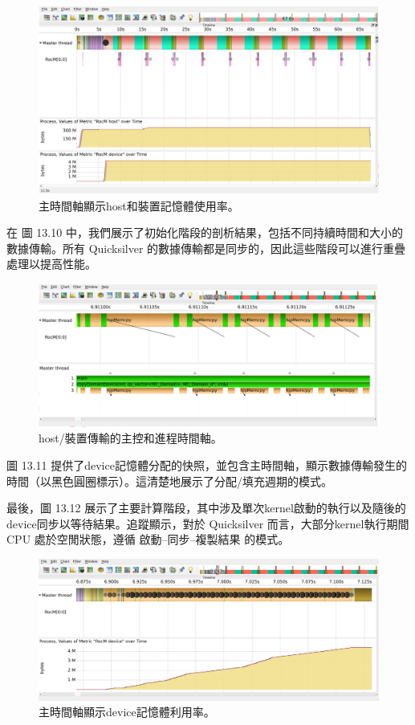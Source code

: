 \begin{figure}
    \centering
    \includegraphics[width=0.9\linewidth]{FileAusiliari/Screenshots/Figure13-9.png}
    \caption{主時間軸顯示host和裝置記憶體使用率。}
    \label{fig:PAPI9}
\end{figure}


在 圖 13.10 中，我們展示了初始化階段的剖析結果，包括不同持續時間和大小的數據傳輸。所有 Quicksilver 的數據傳輸都是同步的，因此這些階段可以進行重疊處理以提高性能。
\begin{figure}
    \centering
    \includegraphics[width=0.9\linewidth]{FileAusiliari/Screenshots/Figure13-10.png}
    \caption{host/裝置傳輸的主控和進程時間軸。}
    \label{fig:PAPI10}
\end{figure}

圖 13.11 提供了device記憶體分配的快照，並包含主時間軸，顯示數據傳輸發生的時間（以黑色圓圈標示）。這清楚地展示了分配/填充週期的模式。

最後，圖 13.12 展示了主要計算階段，其中涉及單次kernel啟動的執行以及隨後的device同步以等待結果。追蹤顯示，對於 Quicksilver 而言，大部分kernel執行期間 CPU 處於空閒狀態，遵循 啟動–同步–複製結果 的模式。

\begin{figure}
    \centering
    \includegraphics[width=0.9\linewidth]{FileAusiliari/Screenshots/Figure13-11.png}
    \caption{主時間軸顯示device記憶體利用率。}
    \label{fig:PAPI11}
\end{figure}

